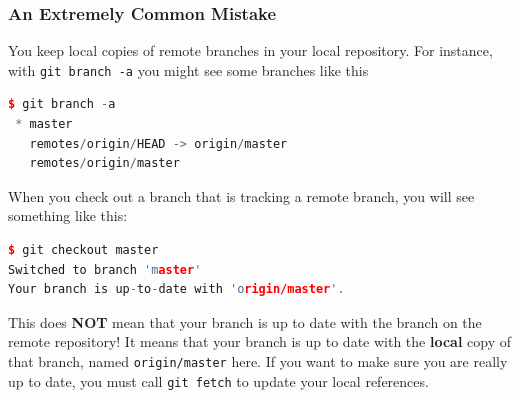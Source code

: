 \documentclass{beamer}
\begin{document}
\begin{frame}[fragile]
\frametitle{An Extremely Common Mistake}
You keep local copies of remote branches in your local repository. For instance, with \lstinline{git branch -a} you might see some branches like this
\begin{lstlisting}[language=C++]
$ git branch -a
 * master
   remotes/origin/HEAD -> origin/master
   remotes/origin/master
\end{lstlisting}
When you check out a branch that is tracking a remote branch, you will see something like this:
\begin{lstlisting}[language=C++]
$ git checkout master
Switched to branch 'master'
Your branch is up-to-date with 'origin/master'.
\end{lstlisting}
This does \textbf{NOT} mean that your branch is up to date with the branch on the remote repository! It means that your branch is up to date with the \textbf{local} copy of that branch, named \lstinline{origin/master} here.
If you want to make sure you are really up to date, you must call \lstinline{git fetch} to update your local references.
\end{frame}
\end{document}
